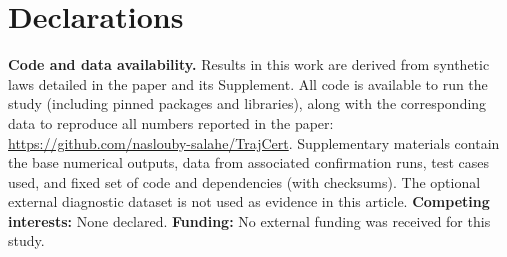 \section*{Declarations} 
\noindent\textbf{Code and data availability.} Results in this work are derived from synthetic laws detailed in the paper and its Supplement. All code is available to run the study (including pinned packages and libraries), along with the corresponding data to reproduce all numbers reported in the paper: \url{https://github.com/naslouby-salahe/TrajCert}. Supplementary materials contain the base numerical outputs, data from associated confirmation runs, test cases used, and fixed set of code and dependencies (with checksums). The optional external diagnostic dataset is not used as evidence in this article. \textbf{Competing interests:} None declared. \textbf{Funding:} No external funding was received for this study.
